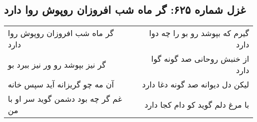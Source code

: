 \begin{center}
\section*{غزل شماره ۶۲۵: گر ماه شب افروزان روپوش روا دارد}
\label{sec:0625}
\begin{longtable}{l p{0.5cm} r}
گر ماه شب افروزان روپوش روا دارد
&&
گیرم که بپوشد رو بو را چه دوا دارد
\\
گر نیز بپوشد رو ور نیز ببرد بو
&&
از خنبش روحانی صد گونه گوا دارد
\\
آن مه چو گریزانه آید سپس خانه
&&
لیکن دل دیوانه صد گونه دغا دارد
\\
غم گر چه بود دشمن گوید سر او با من
&&
با مرغ دلم گوید کو دام کجا دارد
\\
\end{longtable}
\end{center}
